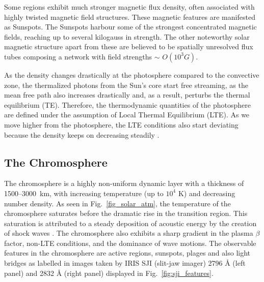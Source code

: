 Some regions exhibit much stronger magnetic flux density, often associated with highly twisted magnetic field structures. These magnetic features are manifested as Sunspots. The Sunspots harbour some of the strongest concentrated magnetic fields, reaching up to several kilogauss in strength. The other noteworthy solar magnetic structure apart from these are believed to be spatially unresolved flux tubes composing a network with field strengths $\sim$ {\it $O(10^{3} G)$}\citep{solanki93,grossman96,rubio19}.

As the density changes drastically at the photosphere compared to the convective zone, the thermalized photons from the Sun's core start free streaming, as the mean free path also increases drastically and, as a result, perturbs the thermal equilibrium (TE). Therefore, the thermodynamic quantities of the photosphere are defined under the assumption of Local Thermal Equilibrium (LTE). As we move higher from the photosphere, the LTE conditions also start deviating because the density keeps on decreasing steadily \citep{philips08}.

\subsection{The Chromosphere}\label{chromosphere}

The chromosphere is a highly non-uniform dynamic layer with a thickness of 1500{--}3000~km, with increasing temperature (up to $10^{4}$ K) and decreasing number density. As seen in Fig.~\ref{fig_solar_atm}, the temperature of the chromosphere saturates before the dramatic rise in the transition region. This saturation is attributed to a steady deposition of acoustic energy by the creation of shock waves \citep{carlsson07}. The chromosphere also exhibits a sharp gradient in the plasma $\beta$ factor, non-LTE conditions, and the dominance of wave motions. The observable features in the chromosphere are active regions, sunspots, plages and also light bridges as labelled in images taken by IRIS SJI (slit-jaw imager) 2796 {\AA} (left panel) and 2832 {\AA} (right panel) displayed in Fig.~\ref{fig:sji_features}.  

